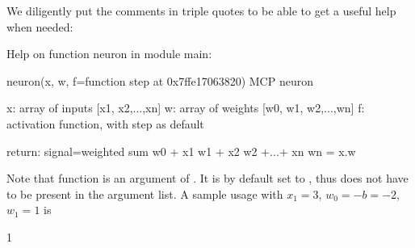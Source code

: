\documentclass[a4paper,12pt,polish]{jupyterBook}
\begin{document}
\sphinxAtStartPar
We diligently put the comments in triple quotes to be able to get a useful help when needed:
\begin{sphinxVerbatimInput}

\begin{sphinxVerbatim}[commandchars=\\\{\}]
\end{sphinxVerbatim}
\end{sphinxVerbatimInput}
\begin{sphinxVerbatimOutput}

\begin{sphinxVerbatim}[commandchars=\\\{\}]
Help on function neuron in module \PYGZus{}\PYGZus{}main\PYGZus{}\PYGZus{}:

neuron(x, w, f=\PYGZlt{}function step at 0x7ffe17063820\PYGZgt{})
    MCP neuron
    
    x: array of inputs  [x1, x2,...,xn]
    w: array of weights [w0, w1, w2,...,wn]
    f: activation function, with step as default
    
    return: signal=weighted sum w0 + x1 w1 + x2 w2 +...+ xn wn = x.w
\end{sphinxVerbatim}
\end{sphinxVerbatimOutput}

\sphinxAtStartPar
Note that function  is an argument of . It is by default set to , thus does not have to be present in the argument list. A sample usage with \(x_1=3\), \(w_0=-b=-2\), \(w_1=1\) is
\begin{sphinxVerbatimInput}

\begin{sphinxVerbatim}[commandchars=\\\{\}]
\PYG{p}{[}\PYG{p}{]}\PYG{p}{[}\PYG{p}{]}
\end{sphinxVerbatim}
\end{sphinxVerbatimInput}
\begin{sphinxVerbatimOutput}

\begin{sphinxVerbatim}[commandchars=\\\{\}]
1
\end{sphinxVerbatim}
\end{sphinxVerbatimOutput}
\end{document}
